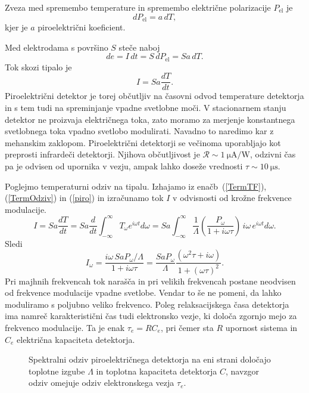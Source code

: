 Zveza med spremembo temperature in spremembo električne polarizacije $P_\mathrm{el}$ je
\begin{equation}
dP_\mathrm{el} = a\, dT,
\end{equation}
kjer je $a$ piroelektrični koeficient. 

Med elektrodama s površino $S$ steče naboj
\begin{equation}
de = I\, dt = S\, dP_\mathrm{el} = S a\, dT.
\end{equation}
Tok skozi tipalo je
\begin{equation}
I = S a \frac{dT}{dt}.
\label{piro}
\end{equation}
Piroelektrični detektor je torej občutljiv na časovni odvod temperature detektorja in s tem 
tudi na spreminjanje vpadne svetlobne moči. V stacionarnem stanju 
detektor ne proizvaja električnega toka, zato moramo za merjenje 
konstantnega svetlobnega toka vpadno svetlobo modulirati.
Navadno to naredimo kar z mehanskim zaklopom. Piroelektrični detektorji
se večinoma uporabljajo kot preprosti infrardeči detektorji.
Njihova občutljivost je $\mathcal{R} \sim 1~\si{\micro\ampere/\watt}$, odzivni čas pa je odvisen od 
upornika v vezju, ampak lahko doseže vrednosti $\tau \sim 10~\si{\micro\second}$.

Poglejmo temperaturni odziv na tipalu. Izhajamo iz enačb~(\ref{TermTF}), (\ref{TermOdziv}) in
(\ref{piro}) in izračunamo tok $I$ v odvisnosti od krožne frekvence modulacije.
\begin{equation}
I = Sa \frac{dT}{dt} = Sa \frac{d}{dt} \int_{-\infty}^{\infty} T_\omega e^{i\omega t}d\omega 
=Sa\int_{-\infty}^{\infty}\frac{1}{\Lambda}\left(\frac{P_\omega}{1+i \omega \tau}\right) \,i \omega\,
e^{i\omega t}d\omega.
\end{equation}
Sledi 
\begin{equation}
I_\omega = \frac{i \omega\, SaP_\omega/\Lambda}{1 + i \omega \tau} = 
\frac{SaP_\omega}{\Lambda}\frac{(\omega^2\tau + i \omega)}{1+(\omega\tau)^2}.
\end{equation}
Pri majhnih frekvencah tok narašča in pri velikih frekvencah postane neodvisen od
frekvence modulacije vpadne svetlobe. Vendar to še ne pomeni, da lahko moduliramo s poljubno 
veliko frekvenco. Poleg relaksacijskega časa detektorja ima namreč karakteristični čas tudi
elektronsko vezje, ki določa zgornjo mejo za frekvenco modulacije. 
Ta je enak $\tau_e = RC_e$, pri čemer
sta $R$ upornost sistema in $C_e$ električna kapaciteta detektorja. 
\begin{figure}[h]
\centering
\def\svgwidth{90truemm} 

\caption{Spektralni odziv piroelektričnega detektorja na eni strani določajo toplotne izgube 
$\Lambda$ in toplotna kapaciteta detektorja $C$, navzgor odziv omejuje odziv elektronskega vezja $\tau_e$.}
\label{fig:Piro}
\end{figure}

